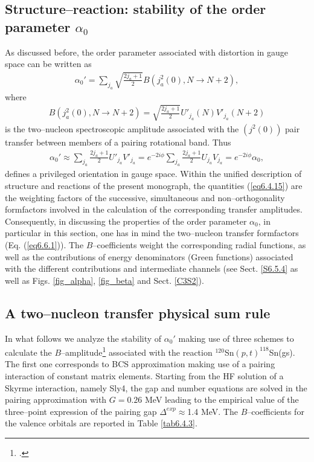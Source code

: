 \subsection{Structure--reaction: stability of the order parameter $\alpha_0$}\label{C6S2.3}
As discussed before, the order parameter associated with distortion in gauge space can be written as 
\begin{align}
\alpha_0'=\sum_{j_a}\sqrt{\frac{2j_a+1}{2}}B(j^2_a(0),N\to N+2),
\end{align}
where
\begin{align}\label{eq6.4.15x}
B(j^2_a(0),N\to N+2)=\sqrt{\frac{2j_a+1}{2}}U'_{j_a}(N)V'_{j_a}(N+2)
\end{align}
is the two--nucleon spectroscopic amplitude associated with the $(j^2(0))$ pair transfer between members of a pairing rotational band. Thus 
\begin{align}\label{eq6.4.15}
\alpha_0'\approx\sum_{j_a}\frac{2j_a+1}{2}U'_{j_a}V'_{j_a}=e^{-2i\phi}\sum_{j_a}\frac{2j_a+1}{2}U_{j_a}V_{j_a}=e^{-2i\phi}\alpha_0,
\end{align}
defines a privileged orientation in gauge space. Within the unified description of structure and reactions of the present monograph, the quantities (\ref{eq6.4.15}) are the weighting factors of the successive, simultaneous and non--orthogonality formfactors involved in the calculation of the corresponding transfer amplitudes. Consequently, in discussing the properties of the order parameter $\alpha_0$, in particular in this section, one has in mind the two--nucleon transfer formfactors (Eq. (\ref{eq6.6.1})).  The $B$--coefficients weight the corresponding radial functions, as well as the contributions of energy denominators (Green functions) associated with the different contributions and intermediate channels (see Sect. \ref{S6.5.4} as well as Figs. \ref{fig_alpha}, \ref{fig_beta} and Sect. \ref{C3S2}). 

\subsection{A two--nucleon transfer physical sum rule}\label{S6.4.2}
 In what follows we analyze the stability of $\alpha_0'$ making use of three schemes to calculate the $B$--amplitude\footnote{\cite{Potel:17}.} associated with the reaction $^{120}$Sn$(p,t)^{118}$Sn(gs). The first one corresponds to BCS approximation making use of a pairing interaction of constant matrix elements.  Starting from the HF solution of a Skyrme interaction, namely Sly4, the gap and number equations are solved in the pairing approximation with $G=0.26$ MeV leading to the empirical value of the three--point expression of the pairing gap $\Delta^{exp}\approx$1.4 MeV. The $B$--coefficients for the valence orbitals are reported in Table \ref{tab6.4.3}. 


